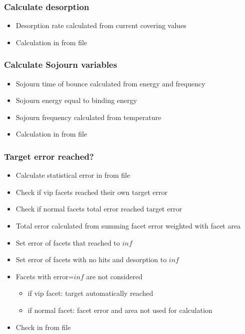 \subsubsection{Calculate desorption}
\begin{itemize}[noitemsep,topsep=0pt, partopsep=0pt]
\item Desorption rate calculated from current covering values
\item Calculation in   from  file
\end{itemize}

\subsubsection{Calculate Sojourn variables}
\begin{itemize}[noitemsep,topsep=0pt, partopsep=0pt]
\item Sojourn time of bounce calculated from energy and frequency
\item Sojourn energy equal to binding energy
\item Sojourn frequency calculated from temperature
\item Calculation in   from  file
\end{itemize}

\subsubsection{Target error reached?}
\begin{itemize}[noitemsep,topsep=0pt, partopsep=0pt]
\item Calculate statistical error in  from  file
\item Check if vip facets reached their own target error
\item Check if normal facets total error reached target error
\item Total error calculated from summing facet error weighted with facet area
\item Set error of facets that reached  to $inf$
\item Set error of facets with no hits and desorption to $inf$
\item Facets with error=$inf$ are not considered
\begin{itemize}[noitemsep,topsep=0pt, partopsep=0pt]
\item if vip facet: target automatically reached
\item if normal facet: facet error and area not used for calculation
\end{itemize}
\item Check in  from  file
\end{itemize}

